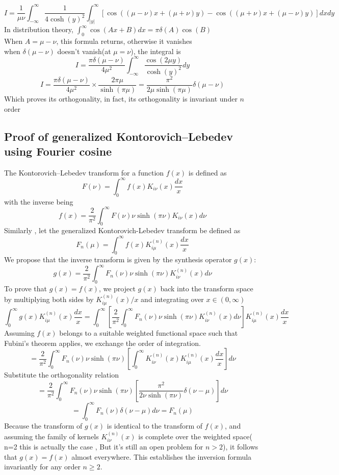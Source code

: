 \documentclass{article}
\begin{document}
\[I= \frac{1}{\mu\nu}\int_{-\infty}^{\infty}\frac{1}{4\cosh(y)^2}\int_{|y|}^{\infty}[\cos((\mu-\nu)x + (\mu+\nu)y) - \cos((\mu+\nu)x + (\mu-\nu)y)] dxdy\]
In distribution theory, $\int_{0}^{\infty} \cos(Ax + B) dx = \pi \delta(A) \cos(B)$\\
When $A=\mu-\nu$, this formula returns, otherwise it vanishes\\
when $\delta(\mu-\nu)$ doesn't vanish(at $\mu = \nu$), the integral is
\[I= \frac{\pi\delta(\mu-\nu)}{4\mu^2}\int_{-\infty}^{\infty}\frac{\cos(2\mu y)}{\cosh(y)^2}dy \]
\[I = \frac{\pi \delta(\mu-\nu)}{4\mu^2} \times\frac{2\pi \mu}{\sinh(\pi \mu)} = \frac{\pi^2}{2\mu \sinh(\pi \mu)} \delta(\mu-\nu)\]
Which proves its orthogonality, in fact, its orthogonality is invariant under $n$ order
\subsection{Proof of generalized Kontorovich–Lebedev using Fourier cosine }
The Kontorovich–Lebedev transform for a function $f(x)$ is defined as\cite{Yakubovich1996}
\[F(\nu) = \int_{0}^{\infty}f(x)K_{i\nu}(x)\frac{dx}{x}\]
with the inverse being
\[f(x) = \frac{2}{\pi^2}\int_{0}^{\infty}F(\nu)\nu\sinh(\pi\nu)K_{i\nu}(x){d\nu}\]
Similarly , let the generalized Kontorovich-Lebedev transform be defined as
\[F_n(\mu) = \int_0^\infty f(x)K_{i\mu}^{(n)}(x)\frac{dx}{x}\]
We propose that the inverse transform is given by the synthesis operator $g(x)$:
\[g(x) = \frac{2}{\pi^2}\int_0^\infty F_n(\nu)\nu\sinh(\pi\nu)K_{i\nu}^{(n)}(x)d\nu\]To prove that $g(x) = f(x)$, we project $g(x)$ back into the transform space by multiplying both sides by $K_{i\mu}^{(n)}(x)/x$ and integrating over $x \in (0, \infty)$
\[\int_0^\infty g(x)K_{i\mu}^{(n)}(x)\frac{dx}{x} = \int_0^\infty \left[ \frac{2}{\pi^2}\int_0^\infty F_n(\nu)\nu\sinh(\pi\nu)K_{i\nu}^{(n)}(x)d\nu \right] K_{i\mu}^{(n)}(x)\frac{dx}{x}\]
Assuming $f(x)$ belongs to a suitable weighted functional space such that Fubini's theorem applies, we exchange the order of integration.
\[= \frac{2}{\pi^2}\int_0^\infty F_n(\nu)\nu\sinh(\pi\nu) \left[ \int_0^\infty K_{i\nu}^{(n)}(x)K_{i\mu}^{(n)}(x)\frac{dx}{x} \right] d\nu\]Substitute the orthogonality relation 
\[= \frac{2}{\pi^2}\int_0^\infty F_n(\nu)\nu\sinh(\pi\nu) \left[ \frac{\pi^2}{2\nu\sinh(\pi\nu)}\delta(\nu-\mu) \right] d\nu\]
\[= \int_0^\infty F_n(\nu)\delta(\nu-\mu)d\nu = F_n(\mu)\]
Because the transform of $g(x)$ is identical to the transform of $f(x)$, and assuming the family of kernels $K_{i\nu}^{(n)}(x)$ is complete over the weighted space( n=2 this is actually the case , But it's still an open problem for $n>2$), it follows that $g(x) = f(x)$ almost everywhere. This establishes the inversion formula invariantly for any order $n \ge 2$.
\end{document}
